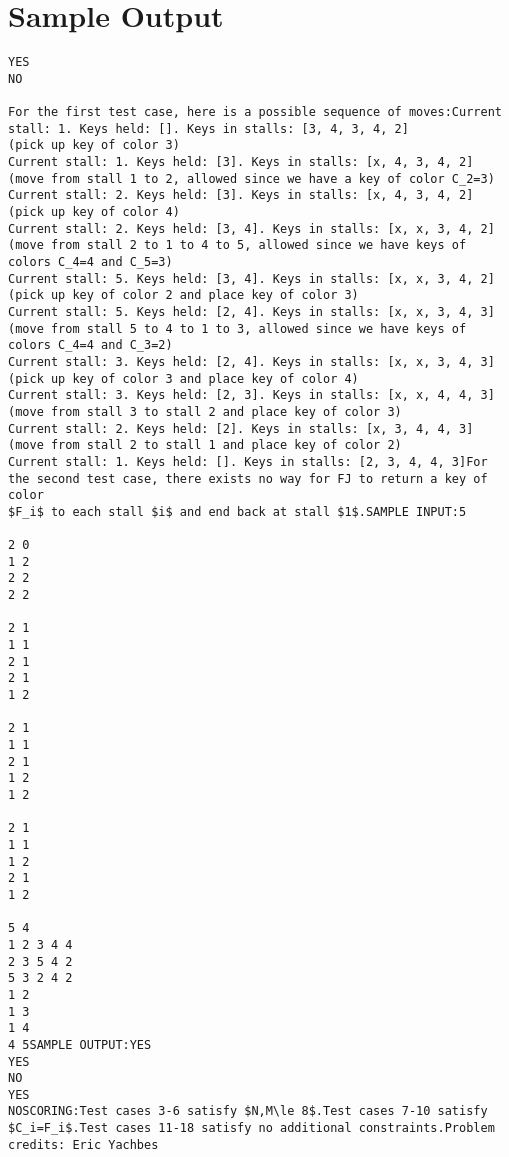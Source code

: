 \documentclass[12pt]{article}
\begin{document}
\section*{Sample Output}
\begin{verbatim}
YES
NO

For the first test case, here is a possible sequence of moves:Current stall: 1. Keys held: []. Keys in stalls: [3, 4, 3, 4, 2]
(pick up key of color 3)
Current stall: 1. Keys held: [3]. Keys in stalls: [x, 4, 3, 4, 2]
(move from stall 1 to 2, allowed since we have a key of color C_2=3)
Current stall: 2. Keys held: [3]. Keys in stalls: [x, 4, 3, 4, 2]
(pick up key of color 4)
Current stall: 2. Keys held: [3, 4]. Keys in stalls: [x, x, 3, 4, 2]
(move from stall 2 to 1 to 4 to 5, allowed since we have keys of colors C_4=4 and C_5=3)
Current stall: 5. Keys held: [3, 4]. Keys in stalls: [x, x, 3, 4, 2]
(pick up key of color 2 and place key of color 3)
Current stall: 5. Keys held: [2, 4]. Keys in stalls: [x, x, 3, 4, 3]
(move from stall 5 to 4 to 1 to 3, allowed since we have keys of colors C_4=4 and C_3=2)
Current stall: 3. Keys held: [2, 4]. Keys in stalls: [x, x, 3, 4, 3]
(pick up key of color 3 and place key of color 4)
Current stall: 3. Keys held: [2, 3]. Keys in stalls: [x, x, 4, 4, 3]
(move from stall 3 to stall 2 and place key of color 3)
Current stall: 2. Keys held: [2]. Keys in stalls: [x, 3, 4, 4, 3]
(move from stall 2 to stall 1 and place key of color 2)
Current stall: 1. Keys held: []. Keys in stalls: [2, 3, 4, 4, 3]For the second test case, there exists no way for FJ to return a key of color
$F_i$ to each stall $i$ and end back at stall $1$.SAMPLE INPUT:5

2 0
1 2
2 2
2 2

2 1
1 1
2 1
2 1
1 2

2 1
1 1
2 1
1 2
1 2

2 1
1 1
1 2
2 1
1 2

5 4
1 2 3 4 4
2 3 5 4 2
5 3 2 4 2
1 2
1 3
1 4
4 5SAMPLE OUTPUT:YES
YES
NO
YES
NOSCORING:Test cases 3-6 satisfy $N,M\le 8$.Test cases 7-10 satisfy $C_i=F_i$.Test cases 11-18 satisfy no additional constraints.Problem credits: Eric Yachbes


\end{verbatim}
\end{document}
